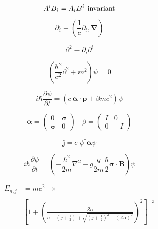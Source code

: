 \documentclass[11pt]{article}
\newcommand{\vect}[1]{\boldsymbol{\mathbf{#1}}}
\begin{document}
\begin{multicols}{2}
\begin{equation}
A^i B_i = A_i B^i \:\: {\rm invariant}
\end{equation}

\begin{equation}
\partial_i \equiv (\frac{1}{c}\partial_t, \vect{\nabla})
\end{equation}

\begin{equation}
\partial^2 \equiv \partial_{i} \partial^{i}
\end{equation}

\begin{equation}
\left( \frac{\hbar^2}{c^2} \partial^2 + m^2 \right) \psi = 0 
\end{equation}

\begin{equation}
i \hbar \frac{\partial \psi}{\partial t} = 
 \left( c \: \vect{\alpha} \cdot \vect{p} + \beta mc^2 \right) \psi
\end{equation}

\begin{equation}
\vect{\alpha} = \left(
                   \begin{array}{cc}
                     0 & \vect{\sigma} \\
                     \vect{\sigma} & 0 
                   \end{array}
                \right)
\:\:\:\:
\beta = \left(
           \begin{array}{cc}
              I & 0 \\
              0 & -I 
           \end{array}
        \right)
\end{equation}

\begin{equation}
\vect{j} = c \: \psi^{\dagger} \vect{\alpha} \psi
\end{equation}

\begin{equation}
i \hbar \frac{\partial \psi}{\partial t} =
\left (-\frac{\hbar^2}{2m} \nabla^2 
  - g \frac{q}{2m} \frac{\hbar}{2} \vect{\sigma}\cdot \vect{B} \right) 
  \psi
\end{equation}

\begin{align}
  E_{n,j} & = mc^2 \:\:\: \times \nonumber \\ 
    & \left[1 +
    \left(
    \frac{Z\alpha}{
      n - (j+\frac{1}{2}) + \sqrt{(j+\frac{1}{2})^2 - (Z\alpha)^2}
      }
    \right)^2
    \right]^{-\frac{1}{2}}
\end{align}


\end{multicols}
\end{document}
